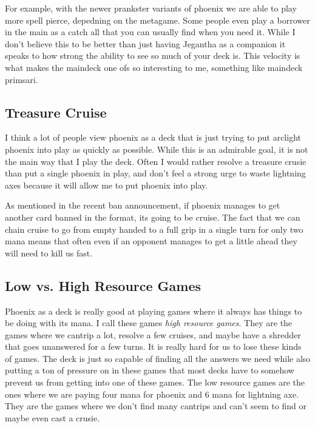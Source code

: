 \documentclass[12pt]{article}
\begin{document}
For example, with the newer prankster variants of phoenix we are able to play more spell pierce, depedning on the metagame. Some people even play a borrower in the main as a catch all that you can usually find when you need it. While I don't believe this to be better than just having Jegantha as a companion it speaks to how strong the ability to see so much of your deck is. This velocity is what makes the maindeck one ofs so interesting to me, something like maindeck primsari.

\subsection{Treasure Cruise}
I think a lot of people view phoenix as a deck that is just trying to put arclight phoenix into play as quickly as possible. While this is an admirable goal, it is not the main way that I play the deck. Often I would rather resolve a treasure crusie than put a single phoenix in play, and don't feel a strong urge to waste lightning axes because it will allow me to put phoenix into play.

As mentioned in the recent ban announcement, if phoenix manages to get another card banned in the format, its going to be cruise. The fact that we can chain cruise to go from empty handed to a full grip in a single turn for only two mana means that often even if an opponent manages to get a little ahead they will need to kill us fast.

\subsection{Low vs. High Resource Games}
Phoenix as a deck is really good at playing games where it always has things to be doing with its mana. I call these games \emph{high resource games}. They are the games where we cantrip a lot, resolve a few cruises, and maybe have a shredder that goes unanswered for a few turns. It is really hard for us to lose these kinds of games. The deck is just so capable of finding all the answers we need while also putting a ton of pressure on in these games that most decks have to somehow prevent us from getting into one of these games. The low resource games are the ones where we are paying four mana for phoenix and 6 mana for lightning axe. They are the games where we don't find many cantrips and can't seem to find or maybe even cast a crusie.
\end{document}
